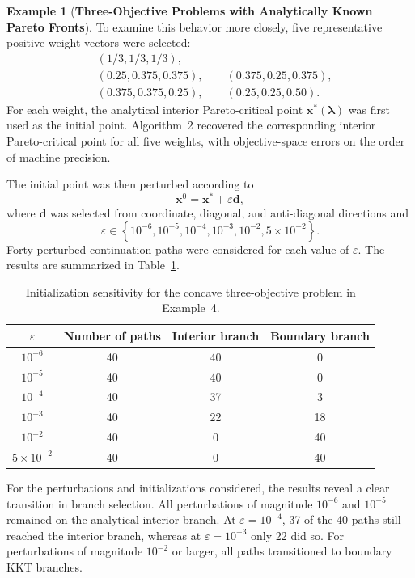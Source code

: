 \documentclass[11pt,pdflatex,sn-mathphys-ay]{sn-jnl}%
\theoremstyle{definition}
\theoremstyle{thmstyleone}%
\theoremstyle{thmstyletwo}%
\newtheorem{example}{Example}%
\theoremstyle{thmstylethree}%
\begin{document}
\begin{example}[\textbf{Three-Objective Problems with Analytically Known Pareto Fronts}]
		To examine this behavior more closely, five representative positive
		weight vectors were selected:
		\[
		\begin{split}
			&(1/3,1/3,1/3),\\
			&(0.25,0.375,0.375),\qquad
			(0.375,0.25,0.375),\\
			&(0.375,0.375,0.25),\qquad
			(0.25,0.25,0.50).
		\end{split}
		\]
		For each weight, the analytical interior Pareto-critical point
		$\mathbf{x}^*(\boldsymbol{\lambda})$ was first used as the initial
		point. Algorithm~2 recovered the corresponding interior
		Pareto-critical point for all five weights, with objective-space errors
		on the order of machine precision.
		
		The initial point was then perturbed according to
		\[
		\mathbf{x}^{0}
		=
		\mathbf{x}^{*}
		+
		\varepsilon\mathbf{d},
		\]
		where $\mathbf{d}$ was selected from coordinate, diagonal, and
		anti-diagonal directions and
		\[
		\varepsilon
		\in
		\left\{
		10^{-6},10^{-5},10^{-4},10^{-3},10^{-2},
		5\times10^{-2}
		\right\}.
		\]
		Forty perturbed continuation paths were considered for each value of
		$\varepsilon$. The results are summarized in
		Table~\ref{tab:example4_concave_perturbation}.
		
		\begin{table}[htbp]
			\centering
			\caption{Initialization sensitivity for the concave three-objective
				problem in Example~4.}
			\label{tab:example4_concave_perturbation}
			\begin{tabular}{c|c|c|c}
				\hline
				$\varepsilon$
				& Number of paths
				& Interior branch
				& Boundary branch\\
				\hline
				$10^{-6}$ & 40 & 40 & 0\\
				$10^{-5}$ & 40 & 40 & 0\\
				$10^{-4}$ & 40 & 37 & 3\\
				$10^{-3}$ & 40 & 22 & 18\\
				$10^{-2}$ & 40 & 0 & 40\\
				$5\times10^{-2}$ & 40 & 0 & 40\\
				\hline
			\end{tabular}
		\end{table}
		
		For the perturbations and initializations
		considered, the results reveal a clear
		transition in branch selection. All
		perturbations of magnitude $10^{-6}$ and $10^{-5}$ remained on the
		analytical interior branch. At $\varepsilon=10^{-4}$, 37 of the 40
		paths still reached the interior branch, whereas at
		$\varepsilon=10^{-3}$ only 22 did so. For perturbations of magnitude
		$10^{-2}$ or larger, all paths transitioned to boundary KKT branches.
		

\end{example}
\end{document}
